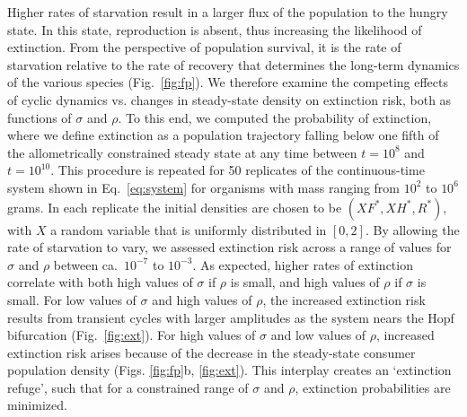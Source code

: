 \documentclass[twocolumn,preprintnumbers,amsmath,amssymb,superscriptaddress]{revtex4}
\begin{document}
\begin{bibunit}[unsrt]
Higher rates of starvation result in a larger flux of the population to the hungry state.
In this state, reproduction is absent, thus increasing the likelihood of extinction.  From the perspective of population survival, it is the rate of starvation relative to the rate of recovery that determines the long-term dynamics of the various species (Fig.~\ref{fig:fp}).
We therefore examine the competing effects of cyclic dynamics vs. changes in steady-state density on extinction risk, both as functions of $\sigma$ and $\rho$.
To this end, we computed the probability of extinction, where we define extinction as a population trajectory falling below one fifth of the allometrically constrained steady state at any time between $t=10^8$ and $t=10^{10}$.
This procedure is repeated for 50 replicates of the continuous-time system shown in Eq.~\ref{eq:system} for organisms with mass ranging from $10^2$ to $10^6$ grams.
In each replicate the initial densities are chosen to be $(XF^*,XH^*,R^*)$, with $X$ a random variable that is uniformly distributed in $[0,2]$.
By allowing the rate of starvation to vary, we assessed extinction risk across a range of values for $\sigma$ and $\rho$ between ca.\ $10^{-7}$ to $10^{-3}$. %
As expected, higher rates of extinction correlate with both high values of $\sigma$ if $\rho$ is small, and high values of $\rho$ if $\sigma$ is small.
For low values of $\sigma$ and high values of $\rho$, the increased extinction risk results from transient cycles with larger amplitudes as the system nears the Hopf bifurcation (Fig.~\ref{fig:ext}).
For high values of $\sigma$ and low values of $\rho$, increased extinction risk arises because of the decrease in the steady-state consumer population density (Figs. \ref{fig:fp}b, \ref{fig:ext}).
This interplay creates an `extinction refuge', such that for a constrained range of $\sigma$ and $\rho$, extinction probabilities are minimized.


\end{bibunit}
\end{document}
